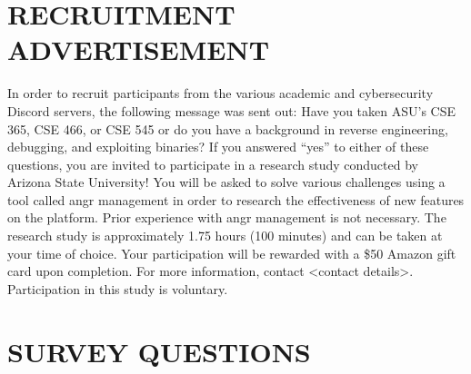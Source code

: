 \chapter{RECRUITMENT ADVERTISEMENT}
\newpage
In order to recruit participants from the various academic and cybersecurity Discord servers, the following message was sent out:
Have you taken ASU’s CSE 365, CSE 466, or CSE 545 or do you have a background in reverse engineering, debugging, and exploiting binaries? If you answered “yes” to either of these questions, you are invited to participate in a research study conducted by Arizona State University! You will be asked to solve various challenges using a tool called angr management in order to research the effectiveness of new features on the platform. Prior experience with angr management is not necessary. The research study is approximately 1.75 hours (100 minutes) and can be taken at your time of choice. Your participation will be rewarded with a \$50 Amazon gift card upon completion. For more information, contact <contact details>. Participation in this study is voluntary.

\chapter{SURVEY QUESTIONS}
\newpage
